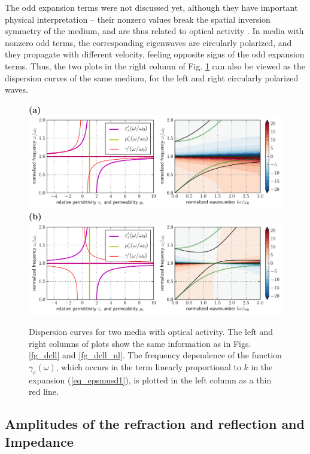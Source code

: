 The odd expansion terms were not discussed yet, although they have important physical interpretation -- their nonzero values break the spatial inversion symmetry of the medium, and are thus related to optical activity \cite{bungay1993equivalency}. 
In media with nonzero odd terms, the corresponding eigenwaves are circularly polarized, and they propagate with different velocity, feeling opposite signs of the odd expansion terms. Thus, the two plots in the right column of Fig. \ref{fg_dcllactivity} can also be viewed as the dispersion curves of the same medium, for the left and right circularly polarized waves.

\begin{figure}[t] \caption{Dispersion curves for two media with optical activity. The left and right columns of plots show the same information as in Figs. \ref{fg_dcll} and \ref{fg_dcll_nl}. The frequency dependence of the function $\gamma_e(\omega)$, which occurs in the term linearly proportional to $k$ in the expansion (\ref{eq_epsmusd1}), is plotted in the left column as a thin red line. } \label{fg_dcllactivity} \centering  
\textbf{(a)}\\\includegraphics[width=1\textwidth]{img/dispersion_landau_lifshitz/dispersion_ll_activep.pdf}
\textbf{(b)}\\\includegraphics[width=1\textwidth]{img/dispersion_landau_lifshitz/dispersion_ll_activen.pdf}
\end{figure}


\subsection{Amplitudes of the refraction and reflection and Impedance}
